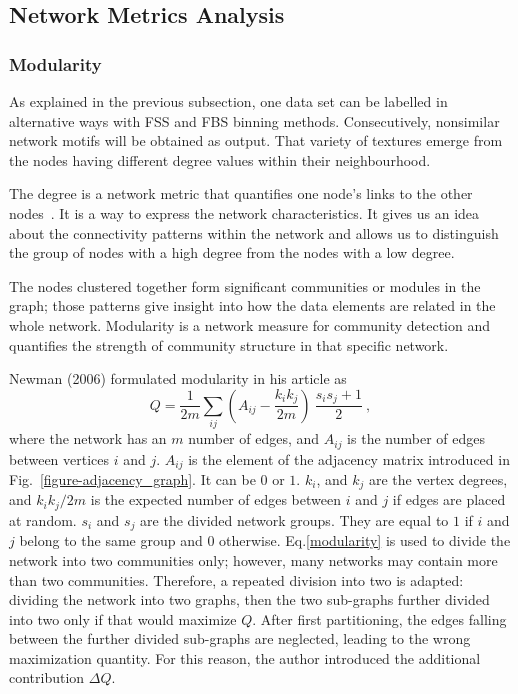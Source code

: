 \subsection*{Network Metrics Analysis}
%
\subsubsection*{Modularity}
As explained in the previous subsection, one data set can be labelled in alternative ways with FSS and FBS binning methods. Consecutively, nonsimilar network motifs will be obtained as output. That variety of textures emerge from the nodes having different degree values within their neighbourhood.

The degree is a network metric that quantifies one node's links to the other nodes~\cite{Barabasi2016}. It is a way to express the network characteristics. It gives us an idea about the connectivity patterns within the network and allows us to distinguish the group of nodes with a high degree from the nodes with a low degree. 

The nodes clustered together form significant communities or modules in the graph; those patterns give insight into how the data elements are related in the whole network. Modularity is a network measure for community detection and quantifies the strength of community structure in that specific network.

Newman (2006) formulated modularity in his article as
\begin{equation} \tag{1}
	Q = \frac {1} {2 m}\sum_ {ij} (A_{ij} - \frac {k_{i} k_{j}}{2 m}) \
	\frac {s_{i} s_{j} + 1} {2}\ ,
	\label{modularity}
\end{equation}
where the network has an $m$ number of edges, and $A_{ij}$ is the number of edges between vertices $i$ and $j$. $A_{ij}$ is the element of the adjacency matrix introduced in Fig.~\ref{figure-adjacency_graph}. It can be $0$ or $1$. $k_{i}$, and $k_{j}$ are the vertex degrees, and ${k_{i} k_{j}}/{2 m}$ is the expected number of edges between $i$ and $j$ if edges are placed at random. $s_{i}$ and $s_{j}$ are the divided network groups. They are equal to $1$ if $i$ and $j$ belong to the same group and $0$ otherwise. Eq.\eqref{modularity} is used to divide the network into two communities only; however, many networks may contain more than two communities. Therefore, a repeated division into two is adapted: dividing the network into two graphs, then the two sub-graphs further divided into two only if that would maximize $Q$. After first partitioning, the edges falling between the further divided sub-graphs are neglected, leading to the wrong maximization quantity. For this reason, the author introduced the additional contribution $\Delta Q$.~\cite{Newman8577}

